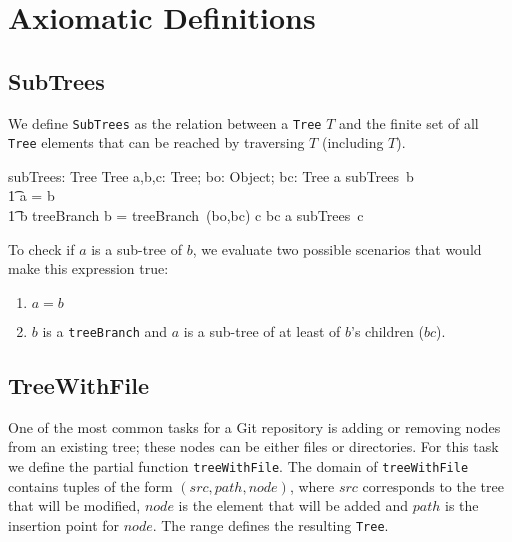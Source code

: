 \section{Axiomatic Definitions}

\subsection{SubTrees}

We define \texttt{SubTrees} as the relation between a \texttt{Tree} $T$ and the
finite set of all \texttt{Tree} elements that can be reached by traversing $T$
(including $T$).

\begin{axdef}
  subTrees: Tree \fun \finset Tree
\where
  \exists a,b,c: Tree; bo: Object; bc: \finset Tree \spot a \in subTrees~b \iff \\
  \t1 a = b \lor \\
  \t1 b \in \ran treeBranch \land b = treeBranch~(bo,bc) \land c \in bc \land a \in subTrees~c
\end{axdef}

To check if $a$ is a sub-tree of $b$, we evaluate two possible scenarios that
would make this expression true:

\begin{enumerate}
  \item $a = b$
  \item $b$ is a \texttt{treeBranch} and $a$ is a sub-tree of at least of $b$'s
  children ($bc$).
\end{enumerate}

\subsection{TreeWithFile}

One of the most common tasks for a Git repository is adding or removing nodes
from an  existing tree; these nodes can be either files or directories. For this
task we define the partial function \texttt{treeWithFile}. The domain of
\texttt{treeWithFile} contains tuples of the form $(src, path, node)$, where
$src$ corresponds to the tree that will be modified, $node$ is the element that
will be added and $path$ is the insertion point for $node$.  The range defines
the resulting \texttt{Tree}.

